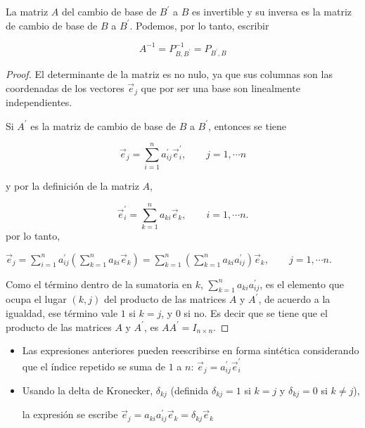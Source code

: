 \begin{theorem}
\label{2141}
La matriz $A$ del cambio de base de  $B ^{\prime}$  a $B$  es invertible  y su inversa es la matriz de cambio de base de $B$ a  $B ^{\prime}$. Podemos,  por lo tanto, escribir

$$A^{-1}=P_{B,B ^{\prime}}^{-1}= P_{B ^{\prime},B}$$

\begin{proof} 

\noindent 
El determinante de la matriz es no nulo, ya que sus columnas son las coordenadas de los vectores $ \vec{e }_j $ que por ser una base son linealmente independientes.

\bigskip




Si  $A^{\prime}$ es la matriz de cambio de base de $B$ a $B^{\prime}$, entonces  se tiene 


$$\vec{e }_j=\sum^{n}_{i=1}a_{ij}^{\prime} \vec{e}^{\prime}_i, \qquad j=1, \cdots n$$

 


\bigskip
\noindent
 y por la definición de la matriz $A$,

 $$\vec{e }^{\prime}_i=\sum^{n}_{k=1}a_{ki} \vec{e}_k, \qquad i=1, \cdots n.$$
\noindent 
 por lo tanto, 

 \bigskip
 
$\vec{e }_j=\sum^{n}_{i=1}a_{ij}^{\prime} (   \sum^{n}_{k=1}a_{ki} \vec{e}_k)=\sum^{n}_{k=1}  (   \sum^{n}_{k=1}a_{ki}   a_{ij}^{\prime} ) \vec{e}_k, \qquad j=1, \cdots n.$


\bigskip


\noindent 
Como el término dentro de la sumatoria en $k$, $ \sum^{n}_{k=1}a_{ki}   a_{ij}^{\prime} $, es el elemento que ocupa el lugar $(k,j)$ del producto de las matrices $A$ y $A^{\prime}$,  de acuerdo a la igualdad, ese término   vale $1$ si $k=j$, y $0$ si no. Es decir que se tiene que el producto de las matrices  $A$ y $A^{\prime}$, es   $AA^{\prime}=I_{n \times n}$.

\end{proof}
\end{theorem}

\bigskip


\bigskip

\begin{remark}

\begin{itemize}



\item
Las expresiones anteriores pueden reescribirse en forma sintética  considerando que el índice repetido se suma de $1$ a $n$: 
$ \vec{e }_j=  a_{ij}^{\prime}  \vec{e}_i^{\prime}$

\bigskip

\item
Usando la delta de Kronecker,  $ \delta_{kj}$ (definida  $ \delta_{kj}=1$ si $k=j$ y $ \delta_{kj}=0$ si $k\neq j$),

\noindent
la expresión se escribe $ \vec{e }_j=a_{ki}  a_{ij}^{\prime}  \vec{e}_k= \delta_{kj}\vec{e}_k$
\end{itemize}
\end{remark}


